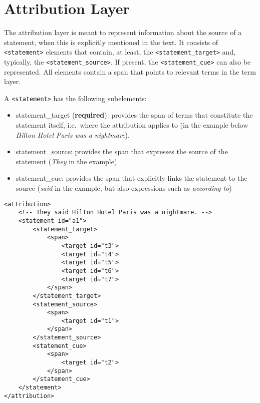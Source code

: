 \section{Attribution Layer}\label{sec:attribution}

The attribution layer is meant to represent information about the source of a statement, when this is explicitly mentioned in the text. It consists of {\tt <statement>} elements that contain, at least, the  {\tt <statement\_target>} and, typically, the {\tt <statement_source>}. If present, the  {\tt <statement\_cue>} can also be represented. All elements contain a span that points to relevant terms in the term layer.

A  {\tt <statement>} has the following subelements:

\begin{itemize}
\item statement\_target (\textbf{required}): provides the span of terms that constitute the statement itself, i.e.\ where the attribution applies to (in the example below \textit{Hilton Hotel Paris was a nightmare}).
\item statement\_source: provides the span that expresses the source of the statement (\textit{They} in the example)
\item statement\_cue: provides the span that explicitly links the statement to the source (\textit{said} in the example, but also expressions such as \textit{according to})
\end{itemize}  


\begin{verbatim}
<attribution>
    <!-- They said Hilton Hotel Paris was a nightmare. -->
    <statement id="a1">
        <statement_target>
            <span>
                <target id="t3">
                <target id="t4">
                <target id="t5">
                <target id="t6">
                <target id="t7">
            </span>
        </statement_target>
        <statement_source>
            <span>
                <target id="t1">
            </span>
        </statement_source>
        <statement_cue>
            <span>
                <target id="t2">
            </span>
        </statement_cue>
    </statement>
</attribution>
\end{verbatim}

